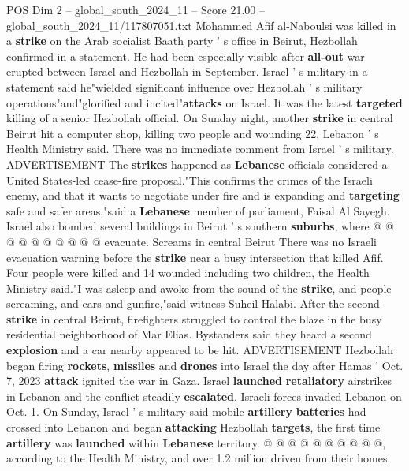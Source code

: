 \begin{textsample}{POS Dim 2 – global\_south\_2024\_11 – Score 21.00 – global\_south\_2024\_11/117807051.txt}  \label{ex:f2_pos_174}
Mohammed Afif al-Naboulsi was killed in a \textbf{strike} on the Arab socialist Baath party ' s office in Beirut, Hezbollah confirmed in a statement.
He had been especially visible after \textbf{all-out} war erupted between Israel and Hezbollah in September.
Israel ' s military in a statement said he"wielded significant influence over Hezbollah ' s military operations"and"glorified and incited"\textbf{attacks} on Israel.
It was the latest \textbf{targeted} killing of a senior Hezbollah official.
On Sunday night, another \textbf{strike} in central Beirut hit a computer shop, killing two people and wounding 22, Lebanon ' s Health Ministry said.
There was no immediate comment from Israel ' s military.
ADVERTISEMENT The \textbf{strikes} happened as \textbf{Lebanese} officials considered a United States-led cease-fire proposal."This confirms the crimes of the Israeli enemy, and that it wants to negotiate under fire and is expanding and \textbf{targeting} safe and safer areas,"said a \textbf{Lebanese} member of parliament, Faisal Al Sayegh.
Israel also bombed several buildings in Beirut ' s southern \textbf{suburbs}, where @ @ @ @ @ @ @ @ @ @ evacuate.
Screams in central Beirut There was no Israeli evacuation warning before the \textbf{strike} near a busy intersection that killed Afif.
Four people were killed and 14 wounded including two children, the Health Ministry said."I was asleep and awoke from the sound of the \textbf{strike}, and people screaming, and cars and gunfire,"said witness Suheil Halabi.
After the second \textbf{strike} in central Beirut, firefighters struggled to control the blaze in the busy residential neighborhood of Mar Elias.
Bystanders said they heard a second \textbf{explosion} and a car nearby appeared to be hit.
ADVERTISEMENT Hezbollah began firing \textbf{rockets}, \textbf{missiles} and \textbf{drones} into Israel the day after Hamas ' Oct. 7, 2023 \textbf{attack} ignited the war in Gaza.
Israel \textbf{launched} \textbf{retaliatory} airstrikes in Lebanon and the conflict steadily \textbf{escalated}.
Israeli forces invaded Lebanon on Oct. 1.
On Sunday, Israel ' s military said mobile \textbf{artillery} \textbf{batteries} had crossed into Lebanon and began \textbf{attacking} Hezbollah \textbf{targets}, the first time \textbf{artillery} was \textbf{launched} within \textbf{Lebanese} territory. @ @ @ @ @ @ @ @ @ @, according to the Health Ministry, and over 1.2 million driven from their homes.

\end{textsample}
